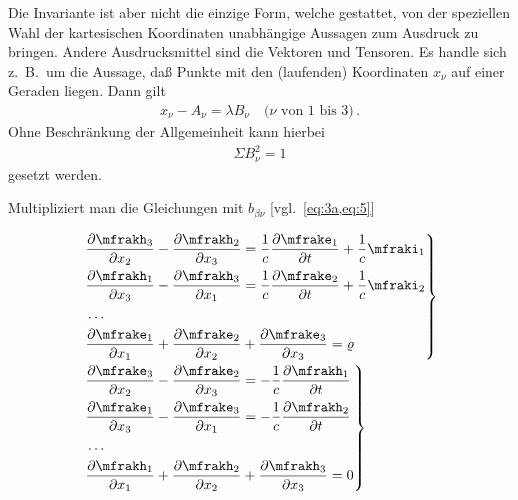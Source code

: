 Die Invariante ist aber nicht die einzige Form, welche gestattet, von der 
speziellen Wahl der kartesischen Koordinaten unabhängige Aussagen zum Ausdruck
zu bringen. Andere Ausdrucksmittel sind die Vektoren und Tensoren. Es handle 
sich z.\ B.\ um die Aussage, daß Punkte mit den (laufenden) Koordinaten 
$x_{\nu}$ auf einer Geraden liegen. Dann gilt
\begin{align*}
x_{\nu} - A_{\nu} = \lambda B_{\nu}\quad \text{($\nu$ von $1$ bis $3$)}\, .
\end{align*}
Ohne Beschränkung der Allgemeinheit kann hierbei
\begin{align*}
\Sigma B_{\nu}^2 = 1
\end{align*}
gesetzt werden.

Multipliziert man die Gleichungen mit $b_{\beta\nu}$ [vgl.\ \cref{eq:3a,eq:5}]

\begin{align}
&\left.
\begin{aligned}
&\frpa{\mfrakh_3}{x_2} - \frpa{\mfrakh_2}{x_3} =
\frac{1}{c} \frpa{\mfrake_1}{t} + \frac{1}{c} \mfraki_1
\\
&\frpa{\mfrakh_1}{x_3} - \frpa{\mfrakh_3}{x_1} =
\frac{1}{c} \frpa{\mfrake_2}{t} + \frac{1}{c} \mfraki_2
\\
&\ldots
\\
&\frpa{\mfrake_1}{x_1} + \frpa{\mfrake_2}{x_2} + \frpa{\mfrake_3}{x_3} = \varrho
\end{aligned}
\right\}
\label{eq:19} \\
&\left.
\begin{aligned}
&\frpa{\mfrake_3}{x_2} - \frpa{\mfrake_2}{x_3} =
-\frac{1}{c} \frpa{\mfrakh_1}{t}
\\
&\frpa{\mfrake_1}{x_3} - \frpa{\mfrake_3}{x_1} =
-\frac{1}{c} \frpa{\mfrakh_2}{t}
\\
&\ldots
\\
&\frpa{\mfrakh_1}{x_1} + \frpa{\mfrakh_2}{x_2} + \frpa{\mfrakh_3}{x_3} = 0
\end{aligned}
\right\}
\label{eq:20}
\end{align}


